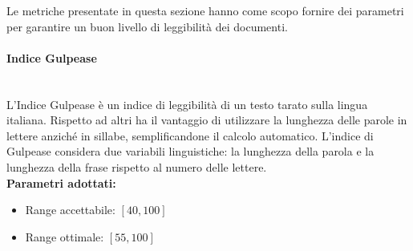 Le metriche presentate in questa sezione hanno come scopo fornire dei parametri per garantire un buon livello di leggibilità dei documenti.

\paragraph{Indice Gulpease}\mbox{}\\[0,3cm]
L'Indice Gulpease è un indice di leggibilità di un testo tarato sulla lingua italiana. Rispetto ad altri ha il vantaggio di utilizzare la lunghezza delle parole in lettere anziché in sillabe, semplificandone il calcolo automatico.
L'indice di Gulpease considera due variabili linguistiche: la lunghezza della parola e la lunghezza della frase rispetto al numero delle lettere.\\[0,2cm]
\textbf{Parametri adottati:}
\begin{itemize}
	\item Range accettabile: $[40 , 100]$
	\item Range ottimale: $[55 , 100]$
\end{itemize}
